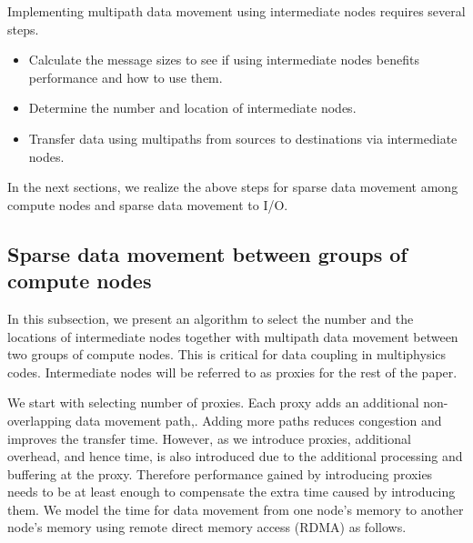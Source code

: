 Implementing multipath data movement using intermediate nodes requires several steps.
\begin{itemize}
\item Calculate the message sizes to see if using intermediate nodes benefits performance and how to use them.
\item Determine the number and location of intermediate nodes.
\item Transfer data using multipaths from sources to destinations via intermediate nodes.
\end{itemize}

In the next sections, we realize the above steps for sparse data movement among compute nodes and sparse data movement to I/O.

\subsection{Sparse data movement between groups of compute nodes}
In this subsection, we present an algorithm to select the number and the locations of intermediate nodes together with multipath data movement between two groups of compute nodes. This is critical for data coupling in multiphysics codes. Intermediate nodes will be referred to as proxies for the rest of the paper. 

We start with selecting number of proxies. Each proxy adds an additional non-overlapping data movement path,. Adding more paths reduces congestion and improves the transfer time. However, as we introduce proxies, additional overhead, and hence time, is also introduced due to the additional processing and buffering at the proxy. Therefore performance gained by introducing proxies needs to be at least enough to compensate the extra time caused by introducing them. We model the time for data movement from one node's memory to another node's memory using remote direct memory access (RDMA) as follows.

